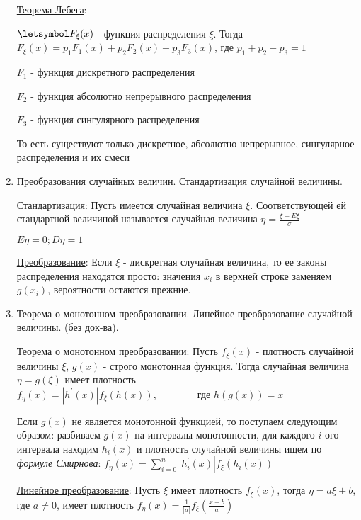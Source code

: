 \begin{enumerate}
    \hyperlink{lebesguetheorem}{Теорема Лебега}: 

    $\letsymbol F_\xi(x)$ - функция распределения $\xi$. Тогда $F_\xi(x) = p_1 F_1(x) + p_2 F_2(x) + p_3 F_3(x)$, где $p_1 + p_2 + p_3 = 1$

    $F_1$ - функция дискретного распределения

    $F_2$ - функция абсолютно непрерывного распределения

    $F_3$ - функция сингулярного распределения

    То есть существуют только дискретное, абсолютно непрерывное, сингулярное распределения и их смеси

    \item Преобразования случайных величин. Стандартизация случайной величины. 

    \hyperlink{standardizationofrandomvalue}{Стандартизация}: Пусть имеется случайная величина $\xi$. Соответствующей ей стандартной величиной называется
    случайная величина $\eta = \frac{\xi - E\xi}{\sigma}$

    $E\eta = 0; D\eta = 1$

    \hyperlink{randomvaluetransformation}{Преобразование}: Если $\xi$ - дискретная случайная величина, то ее законы распределения находятся просто: значения $x_i$ в верхней строке заменяем $g(x_i)$, вероятности остаются прежние.
    
    \item Теорема о монотонном преобразовании. Линейное преобразование случайной величины. (без док-ва).
    
    \hyperlink{monotonoustransformationtheorem}{Теорема о монотонном преобразовании}: \Ths Пусть $f_\xi(x)$ - плотность случайной величины $\xi$, $g(x)$ - строго монотонная функция. Тогда 
    случайная величина $\eta = g(\xi)$ имеет плотность $f_\eta(x) = |h^\prime(x)| f_\xi(h(x)), \qquad\qquad \text{где } h(g(x)) = x$

    Если $g(x)$ не является монотонной функцией, то поступаем следующим образом: разбиваем $g(x)$ на интервалы монотонности, 
    для каждого $i$-ого интервала находим $h_i(x)$ и плотность случайной величины ищем по \textit{формуле Смирнова}: 
    $f_\eta(x) = \sum_{i = 0}^n |h_i^\prime(x)| f_\xi(h_i(x))$
    
    \hyperlink{lineartransformation}{Линейное преобразование}: \Ths Пусть $\xi$ имеет плотность $f_\xi(x)$, тогда $\eta = a\xi + b$, где $a \neq 0$, имеет плотность $f_\eta(x) = \frac{1}{|a|}f_\xi\left(\frac{x - b}{a}\right)$
    

\end{enumerate}
